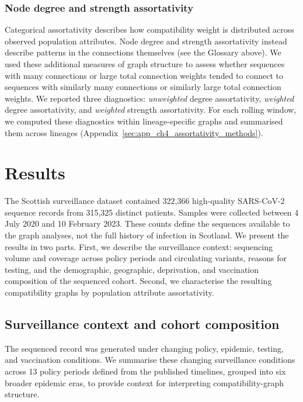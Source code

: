 \subsubsection*{Node degree and strength assortativity}\label{sec:ch4_assortativity_degree_strength}

Categorical assortativity describes how compatibility weight is distributed across observed population attributes. Node degree and strength assortativity instead describe patterns in the connections themselves (see the Glossary above). We used these additional measures of graph structure to assess whether sequences with many connections or large total connection weights tended to connect to sequences with similarly many connections or similarly large total connection weights. We reported three diagnostics: \emph{unweighted} degree assortativity, \emph{weighted} degree assortativity, and \emph{weighted} strength assortativity. For each rolling window, we computed these diagnostics within lineage-specific graphs and summarised them across lineages (Appendix~\ref{sec:app_ch4_assortativity_methods}).

\section{Results}\label{sec:ch4_results}

The Scottish surveillance dataset contained 322,366 high-quality SARS-CoV-2 sequence records from 315,325 distinct patients. Samples were collected between 4 July 2020 and 10 February 2023. These counts define the sequences available to the graph analyses, not the full history of infection in Scotland. We present the results in two parts. First, we describe the surveillance context: sequencing volume and coverage across policy periods and circulating variants, reasons for testing, and the demographic, geographic, deprivation, and vaccination composition of the sequenced cohort. Second, we characterise the resulting compatibility graphs by population attribute assortativity.

\subsection{Surveillance context and cohort composition}\label{sec:ch4_surveillance_setting}

The sequenced record was generated under changing policy, epidemic, testing, and vaccination conditions. We summarise these changing surveillance conditions across 13 policy periods defined from the published timelines, grouped into six broader epidemic eras, to provide context for interpreting compatibility-graph structure.

